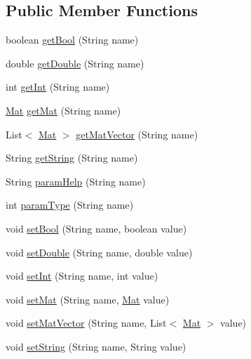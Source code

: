 \subsection*{Public Member Functions}
\begin{DoxyCompactItemize}
\item 
boolean \mbox{\hyperlink{classorg_1_1opencv_1_1core_1_1_algorithm_a71cb1280e9cde9d9d12ff9e0676bc50c}{get\+Bool}} (String name)
\item 
double \mbox{\hyperlink{classorg_1_1opencv_1_1core_1_1_algorithm_a3faf5f8ad213dd4eefe2e7f9db0353e8}{get\+Double}} (String name)
\item 
int \mbox{\hyperlink{classorg_1_1opencv_1_1core_1_1_algorithm_a3ea59576ad9fcd62a7c8031b6fefaa3b}{get\+Int}} (String name)
\item 
\mbox{\hyperlink{classorg_1_1opencv_1_1core_1_1_mat}{Mat}} \mbox{\hyperlink{classorg_1_1opencv_1_1core_1_1_algorithm_a3c0b01f7b49a0afab5867ff2139d438f}{get\+Mat}} (String name)
\item 
List$<$ \mbox{\hyperlink{classorg_1_1opencv_1_1core_1_1_mat}{Mat}} $>$ \mbox{\hyperlink{classorg_1_1opencv_1_1core_1_1_algorithm_a9bdbe462d3257358cef00b05b41b461d}{get\+Mat\+Vector}} (String name)
\item 
String \mbox{\hyperlink{classorg_1_1opencv_1_1core_1_1_algorithm_adc69dc7f2fb5b73a6af5e0c2b5e2d673}{get\+String}} (String name)
\item 
String \mbox{\hyperlink{classorg_1_1opencv_1_1core_1_1_algorithm_a671d4a938b7d853b124f05ee5773caf1}{param\+Help}} (String name)
\item 
int \mbox{\hyperlink{classorg_1_1opencv_1_1core_1_1_algorithm_aa4b62e123c39834a7aef6eba967f4a03}{param\+Type}} (String name)
\item 
void \mbox{\hyperlink{classorg_1_1opencv_1_1core_1_1_algorithm_af9afcf4b2190ab9f50ed21b4d3451108}{set\+Bool}} (String name, boolean value)
\item 
void \mbox{\hyperlink{classorg_1_1opencv_1_1core_1_1_algorithm_a03f21b07c0a55dee632456f823d6fddd}{set\+Double}} (String name, double value)
\item 
void \mbox{\hyperlink{classorg_1_1opencv_1_1core_1_1_algorithm_a7a1154d78b241af75914902f5f7b81de}{set\+Int}} (String name, int value)
\item 
void \mbox{\hyperlink{classorg_1_1opencv_1_1core_1_1_algorithm_a1740e7f522e8ee65b8530832e97dbe93}{set\+Mat}} (String name, \mbox{\hyperlink{classorg_1_1opencv_1_1core_1_1_mat}{Mat}} value)
\item 
void \mbox{\hyperlink{classorg_1_1opencv_1_1core_1_1_algorithm_afbe4677127e5edd023c070709d8a340c}{set\+Mat\+Vector}} (String name, List$<$ \mbox{\hyperlink{classorg_1_1opencv_1_1core_1_1_mat}{Mat}} $>$ value)
\item 
void \mbox{\hyperlink{classorg_1_1opencv_1_1core_1_1_algorithm_ae44015a701fcfd8cc784df1c93399cea}{set\+String}} (String name, String value)
\end{DoxyCompactItemize}
